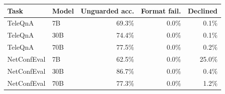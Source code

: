 \begin{tabular}{llrrr}
\toprule
Task & Model & Unguarded acc. & Format fail. & Declined \\
\midrule
TeleQnA & 7B & 69.3\% & 0.0\% & 0.1\% \\
TeleQnA & 30B & 74.4\% & 0.0\% & 0.1\% \\
TeleQnA & 70B & 77.5\% & 0.0\% & 0.2\% \\
NetConfEval & 7B & 62.5\% & 0.0\% & 25.0\% \\
NetConfEval & 30B & 86.7\% & 0.0\% & 0.4\% \\
NetConfEval & 70B & 77.3\% & 0.0\% & 1.2\% \\
\bottomrule
\end{tabular}
